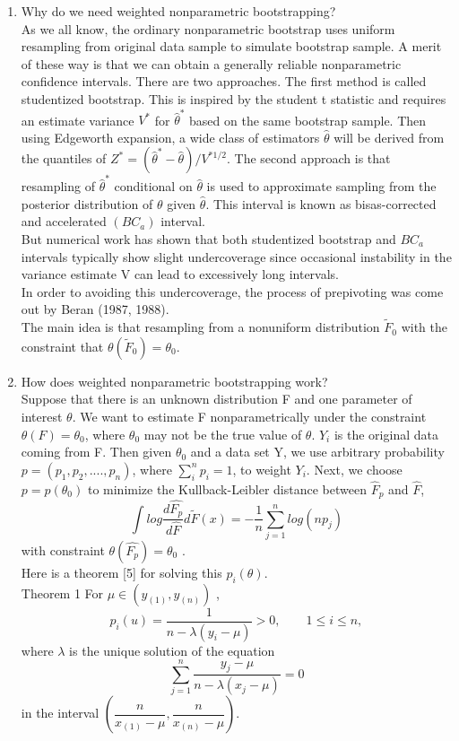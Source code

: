 \documentclass[11pt]{article}
\begin{document}
\begin{enumerate}
\item Why do we need weighted nonparametric bootstrapping? \\
As we all know, the ordinary nonparametric bootstrap uses uniform resampling from original data sample to simulate bootstrap sample. A merit of these way is that we can obtain a generally reliable nonparametric confidence intervals. There are two approaches. The first method is called studentized bootstrap. This is inspired by the student t statistic and requires an estimate variance $ V^* $ for $ \hat{\theta}^* $ based on the same bootstrap sample. Then using Edgeworth expansion, a wide class of estimators $ \hat{\theta} $ will be derived from the quantiles of $ Z^* = (\hat{\theta}^* -\hat{\theta} )/V^{*1/2} $. The second approach is that resampling of $ \hat{\theta}^* $ conditional on $ \hat{\theta} $ is used to approximate sampling from the posterior distribution of $\theta $ given $\hat{\theta} $. This interval is known as bisas-corrected and accelerated $(BC_a)$ interval.\\
But numerical work has shown that both studentized bootstrap and $ BC_a $ intervals typically show slight undercoverage since occasional instability in the variance estimate V can lead to excessively long intervals. \\
In order to avoiding this undercoverage, the process of prepivoting was come out by Beran (1987, 1988). \\
The main idea is that resampling from a nonuniform distribution $ \widetilde{F}_0 $ with the constraint that $ \theta(\widetilde{F}_0 ) = \theta_0 $.  \\

\item How does weighted nonparametric bootstrapping work? \\
Suppose that there is an unknown distribution F and one parameter of interest $ \theta $. We want to estimate F nonparametrically under the constraint $ \theta(F) =\theta_0 $, where $ \theta_0 $ may not be the true value of $ \theta $. $ Y_i $ is the original data coming from F. Then given $ \theta_0 $ and a data set Y, we use arbitrary probability $ p= ( p_1, p_2, ...., p_n ) $, where $ \sum_i ^n p_i=1 $, to weight $ Y_i $. Next, we choose $ p=p(\theta_0) $ to minimize the Kullback-Leibler distance between $ \hat{F}_p $ and $ \hat{F} $,
$$ \int log\dfrac{d \hat{F_p} }{d \hat{F}} d \widetilde{F}(x) = -\dfrac{1}{n} \sum_{j=1}^n log(n p_j) $$ with constraint $ \theta(\hat{F_p})= \theta_0 $ . \\
Here is a theorem [5] for solving this $ p_i(\theta) $. \\
Theorem 1 For $ \mu \in ( y_{(1)}, y_{(n)}) $ ,
$$ p_i(u)=\dfrac{1}{n- \lambda (y_i - \mu )} >0 , \qquad 1\le i \le n , $$
where $ \lambda $ is the unique solution of the equation $$ \sum_{j=1}^n \dfrac{y_j - \mu}{n- \lambda (x_j - \mu)}=0 $$ in the interval $(\dfrac{n}{x_{(1)}-\mu}, \dfrac{n}{x_{(n)}-\mu} )$.


\end{enumerate}
\end{document}
